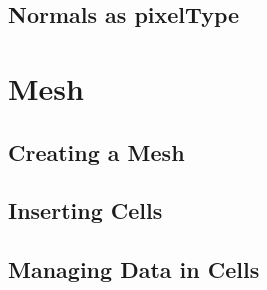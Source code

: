 


\subsection{Normals as pixelType}
\label{sec:PointSetWithCovariantVectorsAsPixelType}






\section{Mesh}\label{MeshSection}

\subsection{Creating a Mesh}
\label{sec:CreatingAMesh}




\subsection{Inserting Cells}
\label{sec:InsertingCellsInMesh}




\subsection{Managing Data in Cells}
\label{sec:ManagingCellDataInMesh}





